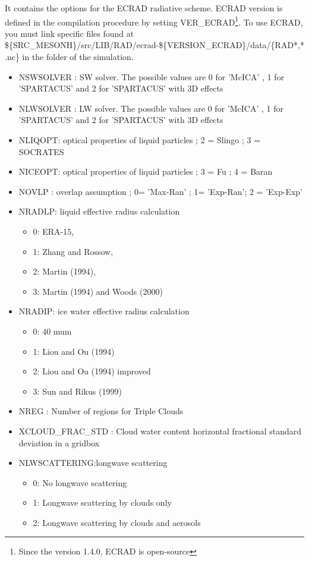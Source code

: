 It contains the options for the ECRAD radiative scheme. ECRAD version is defined in the compilation procedure by setting VER\_ECRAD\footnote{Since the version 1.4.0, ECRAD is open-source}. To use ECRAD, you must link specific files found at \$\{SRC\_MESONH\}/src/LIB/RAD/ecrad-\$\{VERSION\_ECRAD\}/data/\{RAD*,*.nc\} in the folder of the simulation.
\begin{itemize}
\item NSWSOLVER : SW solver. The possible values are 0 for 'McICA' , 1 for 'SPARTACUS' and 2 for 'SPARTACUS' with 3D effects
\item NLWSOLVER : LW solver. The possible values are 0 for 'McICA' , 1 for 'SPARTACUS' and 2 for 'SPARTACUS' with 3D effects
\item NLIQOPT: optical properties of liquid particles ; 2 = Slingo ; 3 = SOCRATES
\item NICEOPT: optical properties of liquid particles ; 3 = Fu ; 4 = Baran
\item NOVLP :  overlap assumption ; 0= 'Max-Ran' ; 1= 'Exp-Ran'; 2 = 'Exp-Exp'
\item NRADLP: liquid effective radius calculation
	\begin{itemize}
		\item 0: ERA-15, 
		\item 1: Zhang and Rossow,
		\item 2: Martin (1994), 
		\item 3: Martin (1994) and Woods (2000)
	\end{itemize}
\item NRADIP: ice water effective radius calculation
	\begin{itemize}
		\item 0: 40 mum
		\item 1: Liou and Ou (1994)
		\item 2: Liou and Ou (1994) improved
		\item 3: Sun and Rikus (1999)
	\end{itemize}
\item NREG : Number of regions for Triple Clouds
\item XCLOUD\_FRAC\_STD :  Cloud water content horizontal fractional standard deviation in a gridbox
\item NLWSCATTERING:longwave scattering
\begin{itemize}
\item 0: No longwave scattering
\item 1: Longwave scattering by clouds only
\item 2: Longwave scattering by clouds and aerosols
\end{itemize}


\end{itemize}
